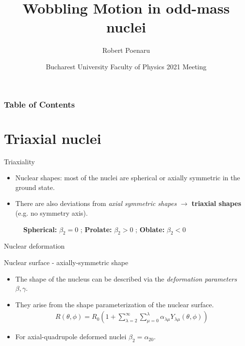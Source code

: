 \documentclass{beamer}
\title[Wobbling Motion in Odd-Mass Nuclei] %
{Wobbling Motion in odd-mass nuclei}
\author[R. Poenaru] %
{Robert Poenaru\inst{1,2}}
\institute[DFT @ IFIN-HH] %
{
  \inst{1}%
  Department of Theoretical Physics\newline
  IFIN-HH
  \and
  \inst{2}%
  Faculty of Physics\newline
  University of Bucharest
}
\date[\today] %
{Bucharest University Faculty of Physics 2021 Meeting}
\begin{document}
\maketitle
\begin{frame}
\frametitle{Table of Contents}
\tableofcontents
\end{frame}

\section{Triaxial nuclei}

\begin{frame}{Triaxiality}
\begin{itemize}
    \item Nuclear shapes: most of the nuclei are spherical or axially symmetric in the ground state.
    \item There are also deviations from \emph{axial symmetric shapes} $\to$ \textbf{triaxial shapes} (e.g. no symmetry axis).
\end{itemize}
  \begin{figure}
    \centering
    \caption{\textbf{Spherical:} $\beta_2=0$ ; \textbf{Prolate:} $\beta_2>0$ ; \textbf{Oblate:} $\beta_2<0$}
  \end{figure}
\end{frame}

\begin{frame}{Nuclear deformation}
    \begin{block}{Nuclear surface - axially-symmetric shape}
    \begin{itemize}
    \item The shape of the nucleus can be described via the \textit{deformation parameters} $\beta,\gamma$. 
    \item They arise from the shape parameterization of the nuclear surface.
    \begin{align}
        R(\theta,\phi)=R_0\left(1+\sum_{\lambda=2}^{\infty}\sum_{\mu=0}^{\lambda}\alpha_{\lambda\mu}Y_{\lambda\mu}(\theta,\phi)\right)
    \end{align}
    \item For axial-quadrupole deformed nuclei $\beta_2=\alpha_{20}$.
    \end{itemize}
    \end{block}
\end{frame}
\end{document}
